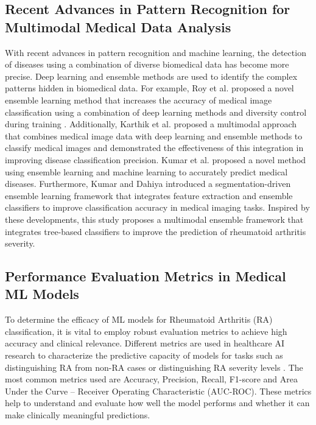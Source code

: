 \documentclass[10pt]{NSP1}
\begin{document}
	\subsection{Recent Advances in Pattern Recognition for Multimodal Medical Data Analysis}
	With recent advances in pattern recognition and machine learning, the detection of diseases using a combination of diverse biomedical data has become more precise. Deep learning and ensemble methods are used to identify the complex patterns hidden in biomedical data. For example, Roy et al. proposed a novel ensemble learning method that increases the accuracy of medical image classification using a combination of deep learning methods and diversity control during training \cite{sharma2022comprehensive}. Additionally, Karthik et al. proposed a multimodal approach that combines medical image data with deep learning and ensemble methods to classify medical images and demonstrated the effectiveness of this integration in improving disease classification precision. Kumar et al. proposed a novel method using ensemble learning and machine learning to accurately predict medical diseases. Furthermore, Kumar and Dahiya introduced a segmentation-driven ensemble learning framework that integrates feature extraction and ensemble classifiers to improve classification accuracy in medical imaging tasks. Inspired by these developments, this study proposes a multimodal ensemble framework that integrates tree-based classifiers to improve the prediction of rheumatoid arthritis severity.
	
	\subsection{Performance Evaluation Metrics in Medical ML Models}
	To determine the efficacy of ML models for Rheumatoid Arthritis (RA) classification, it is vital to employ robust evaluation metrics to achieve high accuracy and clinical relevance. Different metrics are used in healthcare AI research to characterize the predictive capacity of models for tasks such as distinguishing RA from non-RA cases or distinguishing RA severity levels \cite{venugopalan2021multimodal}. The most common metrics used are Accuracy, Precision, Recall, F1-score and Area Under the Curve -- Receiver Operating Characteristic (AUC-ROC). These metrics help to understand and evaluate how well the model performs and whether it can make clinically meaningful predictions.
	
\end{document}
